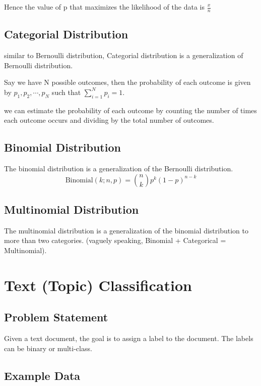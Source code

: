 Hence the value of p that maximizes the likelihood of the data is \( \frac{x}{n} \) 


\subsection{Categorial Distribution}
similar to Bernoulli distribution, Categorial distribution is a generalization of Bernoulli distribution.


\noindent Say we have N possible outcomes, then the probability of each outcome is given by $p_1, p_2, \cdots, p_N$ such that $\sum_{i=1}^{N} p_i = 1$.

we can estimate the probability of each outcome by counting the number of times each outcome occurs and dividing by the total number of outcomes.

\subsection{Binomial Distribution}
The binomial distribution is a generalization of the Bernoulli distribution.
\[
\text{Binomial}(k ; n, p) = \binom{n}{k} p^k (1 - p)^{n - k}
\]


\subsection{Multinomial Distribution}

The multinomial distribution is a generalization of the binomial distribution to more than two categories. (vaguely speaking, Binomial + Categorical = Multinomial). 

\section{Text (Topic) Classification}

\subsection{Problem Statement}
Given a text document, the goal is to assign a label to the document. The labels can be binary or multi-class.


\subsection{Example Data}

